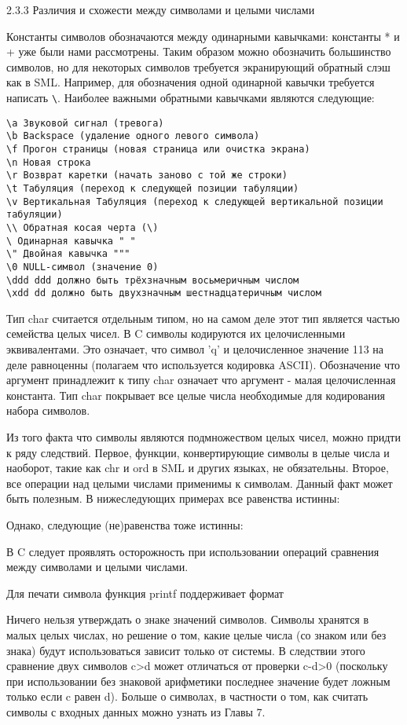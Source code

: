 2.3.3 Различия и схожести между символами и целыми числами

Константы символов обозначаются между одинарными кавычками: константы * и + уже были нами рассмотрены. Таким образом можно обозначить большинство символов, но для некоторых символов требуется экранирующий обратный слэш как в SML. Например, для обозначения одной одинарной кавычки требуется написать \lstinline|\|. Наиболее важными обратными кавычками являются следующие:

\begin{lstlisting}
\a Звуковой сигнал (тревога)
\b Backspace (удаление одного левого символа)
\f Прогон страницы (новая страница или очистка экрана)
\n Новая строка
\r Возврат каретки (начать заново с той же строки)
\t Табуляция (переход к следующей позиции табуляции)
\v Вертикальная Табуляция (переход к следующей вертикальной позиции табуляции)
\\ Обратная косая черта (\)
\ Одинарная кавычка " "
\" Двойная кавычка """
\0 NULL-символ (значение 0)
\ddd ddd должно быть трёхзначным восьмеричным числом
\xdd dd должно быть двухзначным шестнадцатеричным числом
\end{lstlisting}

Тип char считается отдельным типом, но на самом деле этот тип является частью семейства целых чисел. В C символы кодируются их целочисленными эквивалентами. Это означает, что символ 'q' и целочисленное значение 113 на деле равноценны (полагаем что используется кодировка ASCII). Обозначение что аргумент принадлежит к типу char означает что аргумент - малая целочисленная константа. Тип char покрывает все целые числа необходимые для кодирования набора символов.

Из того факта что символы являются подмножеством целых чисел, можно придти к ряду следствий. Первое, функции, конвертирующие символы в целые числа и наоборот, такие как chr и ord в SML и других языках, не обязательны. Второе, все операции над целыми числами применимы к символам. Данный факт может быть полезным. В нижеследующих примерах все равенства истинны:

Однако, следующие (не)равенства тоже истинны:

В C следует проявлять осторожность при использовании операций сравнения между символами и целыми числами.

Для печати символа функция printf поддерживает формат %

Ничего нельзя утверждать о знаке значений символов. Символы хранятся в малых целых числах, но решение о том, какие целые числа (со знаком или без знака) будут использоваться зависит только от системы. В следствии этого сравнение двух символов c>d может отличаться от проверки c-d>0 (поскольку при использовании без знаковой арифметики последнее значение будет ложным только если c равен d). Больше о символах, в частности о том, как считать символы с входных данных можно узнать из Главы 7.


